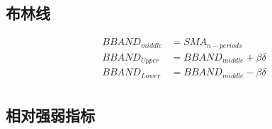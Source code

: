 \subsection{布林线}
\begin{equation}
    \begin{aligned}
        BBAND_{middle} & =SMA_{n-periods}            \\
        BBAND_{Upper}  & =BBAND_{middle}+\beta\delta \\
        BBAND_{Lower}  & =BBAND_{middle}-\beta\delta \\
    \end{aligned}
\end{equation}
\subsection{相对强弱指标}